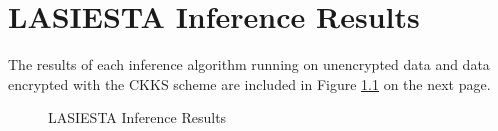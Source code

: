 \chapter{LASIESTA Inference Results}
\label{app:LASIESTA}

\indent \indent
The results of each inference algorithm running on unencrypted data and data encrypted with the CKKS scheme are included in Figure \ref{fig:lasiestaInferenceResults} on the next page.

\begin{figure}
    \centering
    
    \caption{LASIESTA Inference Results}
    \label{fig:lasiestaInferenceResults}
\end{figure}
